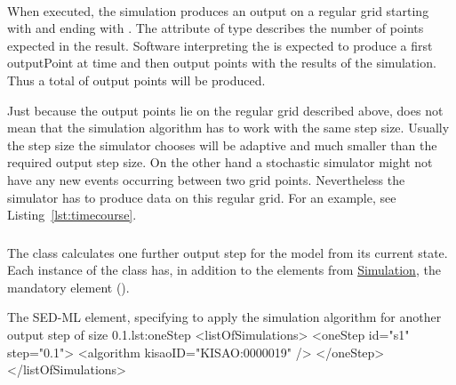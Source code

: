 \paragraph*{}
\label{sec:numberOfPoints}
When executed, the \hyperref[class:uniformTimeCourse]{} simulation produces an output on a regular grid starting with \hyperref[sec:outputStartTime]{} and ending with \hyperref[sec:outputEndTime]{}. The attribute  of type  describes the number of points expected in the result. Software interpreting the \hyperref[class:uniformTimeCourse]{} is expected to produce a first outputPoint at time \hyperref[sec:outputStartTime]{} and then  output points with the results of the simulation. Thus a total of  output points will be produced.

Just because the output points lie on the regular grid described above, does not mean that the simulation algorithm has to work with the same step size. Usually the step size the simulator chooses will be adaptive and much smaller than the required output step size. On the other hand a stochastic simulator might not have any new events occurring between two grid points. Nevertheless the simulator has to produce data on this regular grid. For an example, see Listing~\ref{lst:timecourse}. 


\subsubsection{}
\label{class:oneStep}

The  class calculates one further output step for the model from its current state. Each instance of the  class has, in addition to the elements from \hyperref[class:simulation]{Simulation}, the mandatory element \hyperref[sec:step]{} ().


\begin{myXmlLst}{The SED-ML  element, specifying to apply the simulation algorithm for another output step of size 0.1.}{lst:oneStep}
<listOfSimulations> 
	<oneStep id="s1" step="0.1"> 
		<algorithm kisaoID="KISAO:0000019" />
	</oneStep> 
</listOfSimulations>
\end{myXmlLst}

